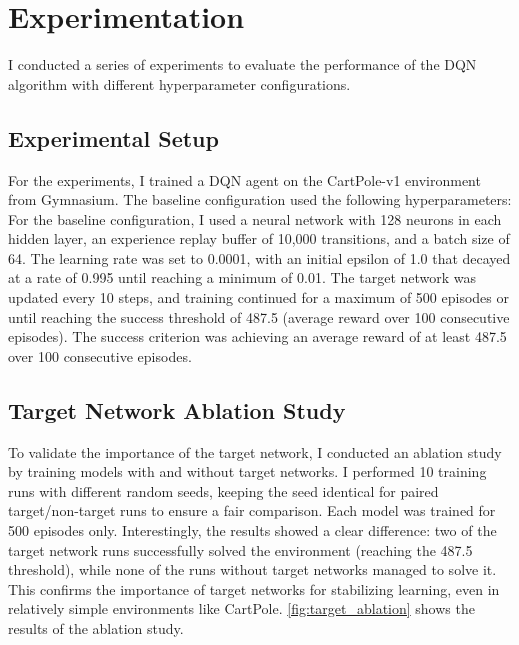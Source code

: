 \documentclass{article}
\begin{document}
\section{Experimentation}
I conducted a series of experiments to evaluate the performance of the DQN algorithm with different hyperparameter configurations.

\subsection{Experimental Setup}
For the experiments, I trained a DQN agent on the CartPole-v1 environment from Gymnasium. The baseline configuration used the following hyperparameters:
For the baseline configuration, I used a neural network with 128 neurons in each hidden layer, an experience replay buffer of 10,000 transitions, and a batch size of 64. The learning rate was set to 0.0001, with an initial epsilon of 1.0 that decayed at a rate of 0.995 until reaching a minimum of 0.01. The target network was updated every 10 steps, and training continued for a maximum of 500 episodes or until reaching the success threshold of 487.5 (average reward over 100 consecutive episodes). The success criterion was achieving an average reward of at least 487.5 over 100 consecutive episodes.

\subsection{Target Network Ablation Study}
To validate the importance of the target network, I conducted an ablation study by training models with and without target networks. I performed 10 training runs with different random seeds, keeping the seed identical for paired target/non-target runs to ensure a fair comparison. Each model was trained for 500 episodes only. Interestingly, the results showed a clear difference: two of the target network runs successfully solved the environment (reaching the 487.5 threshold), while none of the runs without target networks managed to solve it. This confirms the importance of target networks for stabilizing learning, even in relatively simple environments like CartPole. \ref{fig:target_ablation} shows the results of the ablation study.
\end{document}
